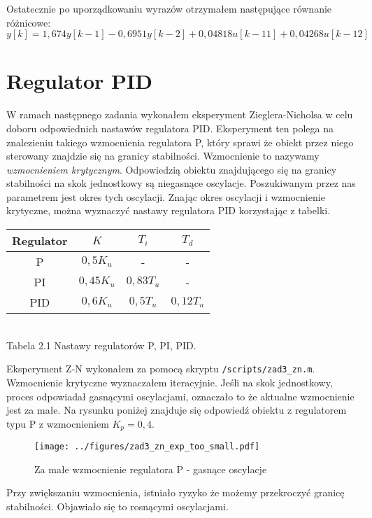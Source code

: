 \documentclass[a4paper,titlepage,11pt,floatssmall]{mwrep}
\begin{document}
Ostatecznie po uporządkowaniu wyrazów otrzymałem następujące równanie różnicowe:
\begin{equation*}
y[k] = 1,674y[k-1] - 0,6951y[k-2] + 0,04818u[k-11] + 0,04268u[k-12]  
\end{equation*}

\newpage

\section{Regulator PID}
W ramach następnego zadania wykonałem eksperyment Zieglera-Nicholsa w celu doboru odpowiednich nastawów regulatora PID. Eksperyment ten polega na znalezieniu takiego wzmocnienia regulatora P, który sprawi że obiekt przez niego sterowany znajdzie się na granicy stabilności. Wzmocnienie to nazywamy \emph{wzmocnieniem krytycznym}. Odpowiedzią obiektu znajdującego się na granicy stabilności na skok jednostkowy są niegasnące oscylacje. Poszukiwanym przez nas parametrem jest okres tych oscylacji. Znając okres oscylacji i wzmocnienie krytyczne, można wyznaczyć nastawy regulatora PID korzystając z tabelki.
\medskip
\begin{center}
\begin{tabular}{|c|c|c|c|} \hline
Regulator & $K$ & $T_i$ & $T_d$ \\
\hline \hline
P & $0,5K_u$ & - & -\\
\hline
PI & $0,45K_u$ & $0,83T_u$ & - \\
\hline
PID & $0,6K_u$ & $0,5T_u$ & $0,12T_u$ \\
\hline 
\end{tabular}\\
Tabela 2.1 Nastawy regulatorów P, PI, PID.
\end{center}
\bigskip
Eksperyment Z-N wykonałem za pomocą skryptu \texttt{/scripts/zad3\_{}zn.m}. 
Wzmocnienie krytyczne wyznaczałem iteracyjnie. Jeśli na skok jednostkowy, proces odpowiadał gasnącymi oscylacjami, oznaczało to że aktualne wzmocnienie jest za małe. Na rysunku poniżej znajduje się odpowiedź obiektu z regulatorem typu P z wzmocnieniem $K_p = 0,4$.

\begin{figure}[H]
\centering
\texttt{[image: ../figures/zad3\_zn\_exp\_too\_small.pdf]}
\caption{Za małe wzmocnienie regulatora P - gasnące oscylacje}
\end{figure}

\newpage
Przy zwiększaniu wzmocnienia, istniało ryzyko że możemy przekroczyć granicę stabilności. Objawiało się to rosnącymi oscylacjami.
\end{document}
